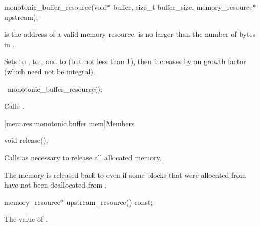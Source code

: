 %
\begin{itemdecl}
monotonic_buffer_resource(void* buffer, size_t buffer_size, memory_resource* upstream);
\end{itemdecl}

\begin{itemdescr}
\pnum
\expects
{} is the address of a valid memory resource.
 is no larger than the number of bytes in .

\pnum
\effects
Sets  to ,
 to , and
 to  (but not less than 1),
then increases 
by an  growth factor (which need not be integral).
\end{itemdescr}

%
\begin{itemdecl}
~monotonic_buffer_resource();
\end{itemdecl}

\begin{itemdescr}
\pnum
\effects
Calls .
\end{itemdescr}


[mem.res.monotonic.buffer.mem]{Members}

%
\begin{itemdecl}
void release();
\end{itemdecl}

\begin{itemdescr}
\pnum
\effects
Calls  as necessary
to release all allocated memory.

\pnum
\begin{note}
The memory is released back to 
even if some blocks that were allocated from 
have not been deallocated from .
\end{note}
\end{itemdescr}

%
\begin{itemdecl}
memory_resource* upstream_resource() const;
\end{itemdecl}

\begin{itemdescr}
\pnum
\returns
The value of .
\end{itemdescr}

